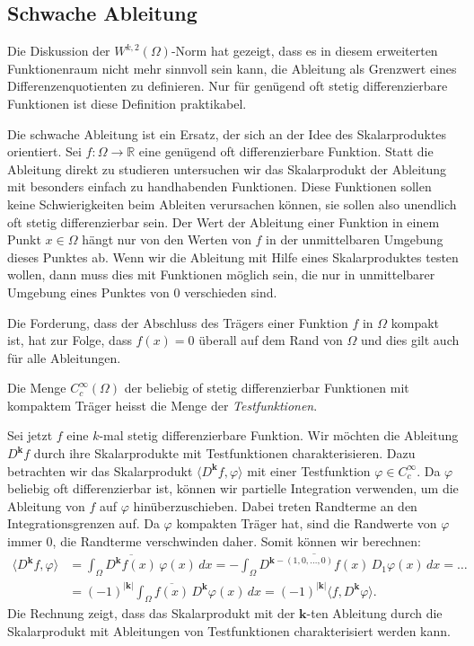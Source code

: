 %
%
\subsection{Schwache Ableitung}
Die Diskussion der $W^{k,2}(\Omega)$-Norm hat gezeigt, dass es in diesem
erweiterten Funktionenraum nicht mehr sinnvoll sein kann, die Ableitung
als Grenzwert eines Differenzenquotienten zu definieren.
Nur für genügend oft stetig differenzierbare Funktionen ist diese
Definition praktikabel.

Die schwache Ableitung ist ein Ersatz, der sich an der Idee des
Skalarproduktes orientiert.
Sei $f\colon \Omega\to\mathbb{R}$ eine genügend oft differenzierbare
Funktion.
Statt die Ableitung direkt zu studieren untersuchen wir das Skalarprodukt
der Ableitung mit besonders einfach zu handhabenden Funktionen.
Diese Funktionen sollen keine Schwierigkeiten beim Ableiten
verursachen können, sie sollen also unendlich oft stetig differenzierbar
sein.
Der Wert der Ableitung einer Funktion in einem Punkt $x\in\Omega$ hängt nur 
von den Werten von $f$ in der unmittelbaren Umgebung dieses Punktes ab.
Wenn wir die Ableitung mit Hilfe eines Skalarproduktes testen wollen,
dann muss dies mit Funktionen möglich sein, die nur in unmittelbarer
Umgebung eines Punktes von $0$ verschieden sind.

Die Forderung, dass der Abschluss des Trägers einer Funktion $f$
in $\Omega$ kompakt ist, hat zur Folge, dass $f(x)=0$ überall auf dem Rand
von $\Omega$ und dies gilt auch für alle Ableitungen.

\begin{definition}[Testfunktion]
%
Die Menge $C_c^{\infty}(\Omega)$ der beliebig of stetig differenzierbar
Funktionen mit kompaktem Träger heisst die Menge der {\em Testfunktionen}.
\end{definition}

Sei jetzt $f$ eine $k$-mal stetig differenzierbare Funktion.
Wir möchten die Ableitung $D^{\bm{k}}f$ durch ihre Skalarprodukte mit
Testfunktionen charakterisieren.
Dazu betrachten wir das Skalarprodukt
\(
\langle D^{\bm{k}}f,\varphi\rangle
\)
mit einer Testfunktion $\varphi \in C_c^{\infty}$.
Da $\varphi$ beliebig oft differenzierbar ist, können wir
partielle Integration verwenden, um die Ableitung von $f$ auf $\varphi$
hinüberzuschieben.
Dabei treten Randterme an den Integrationsgrenzen auf.
Da $\varphi$ kompakten Träger hat, sind die Randwerte von $\varphi$
immer 0, die Randterme verschwinden daher.
Somit können wir berechnen:
\begin{align*}
\langle D^{\bm{k}}f,\varphi\rangle
&=
\int_{\Omega} \overline{D^{\bm{k}}f(x)}\, \varphi(x)\,dx
=
-\int_{\Omega}
\overline{D^{\bm{k}-(1,0,\dots,0)}f(x)}\, 
D_1 \varphi(x)
\,dx
= \dots
\\
&=
(-1)^{|\bm{k}|} \int_{\Omega} \overline{f(x)} \, D^{\bm{k}}\varphi(x) \,dx
=
(-1)^{|\bm{k}|} \langle f,D^{\bm{k}}\varphi\rangle.
\end{align*}
Die Rechnung zeigt, dass das Skalarprodukt mit der $\bm{k}$-ten
Ableitung durch die Skalarprodukt mit Ableitungen von Testfunktionen
charakterisiert werden kann.

